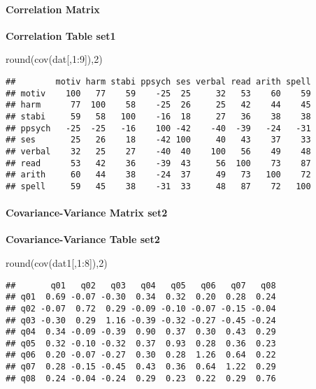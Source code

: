 \documentclass[
]{article}
\newenvironment{Shaded}{\begin{snugshade}}{\end{snugshade}}
\newcommand{\DecValTok}[1]{\textcolor[rgb]{0.00,0.00,0.81}{#1}}
\newcommand{\FunctionTok}[1]{\textcolor[rgb]{0.00,0.00,0.00}{#1}}
\newcommand{\NormalTok}[1]{#1}
\newcommand{\SpecialCharTok}[1]{\textcolor[rgb]{0.00,0.00,0.00}{#1}}
\begin{document}
\hypertarget{correlation-matrix}{%
\paragraph{Correlation Matrix}\label{correlation-matrix}}

\textbf{Correlation Table set1}

\begin{Shaded}
\begin{Highlighting}[]
\FunctionTok{round}\NormalTok{(}\FunctionTok{cov}\NormalTok{(dat[,}\DecValTok{1}\SpecialCharTok{:}\DecValTok{9}\NormalTok{]),}\DecValTok{2}\NormalTok{)}
\end{Highlighting}
\end{Shaded}

\begin{verbatim}
##        motiv harm stabi ppsych ses verbal read arith spell
## motiv    100   77    59    -25  25     32   53    60    59
## harm      77  100    58    -25  26     25   42    44    45
## stabi     59   58   100    -16  18     27   36    38    38
## ppsych   -25  -25   -16    100 -42    -40  -39   -24   -31
## ses       25   26    18    -42 100     40   43    37    33
## verbal    32   25    27    -40  40    100   56    49    48
## read      53   42    36    -39  43     56  100    73    87
## arith     60   44    38    -24  37     49   73   100    72
## spell     59   45    38    -31  33     48   87    72   100
\end{verbatim}

\hypertarget{covariance-variance-matrix-set2}{%
\paragraph{Covariance-Variance Matrix
set2}\label{covariance-variance-matrix-set2}}

\textbf{Covariance-Variance Table set2}

\begin{Shaded}
\begin{Highlighting}[]
\FunctionTok{round}\NormalTok{(}\FunctionTok{cov}\NormalTok{(dat1[,}\DecValTok{1}\SpecialCharTok{:}\DecValTok{8}\NormalTok{]),}\DecValTok{2}\NormalTok{)}
\end{Highlighting}
\end{Shaded}

\begin{verbatim}
##       q01   q02   q03   q04   q05   q06   q07   q08
## q01  0.69 -0.07 -0.30  0.34  0.32  0.20  0.28  0.24
## q02 -0.07  0.72  0.29 -0.09 -0.10 -0.07 -0.15 -0.04
## q03 -0.30  0.29  1.16 -0.39 -0.32 -0.27 -0.45 -0.24
## q04  0.34 -0.09 -0.39  0.90  0.37  0.30  0.43  0.29
## q05  0.32 -0.10 -0.32  0.37  0.93  0.28  0.36  0.23
## q06  0.20 -0.07 -0.27  0.30  0.28  1.26  0.64  0.22
## q07  0.28 -0.15 -0.45  0.43  0.36  0.64  1.22  0.29
## q08  0.24 -0.04 -0.24  0.29  0.23  0.22  0.29  0.76
\end{verbatim}
\end{document}
